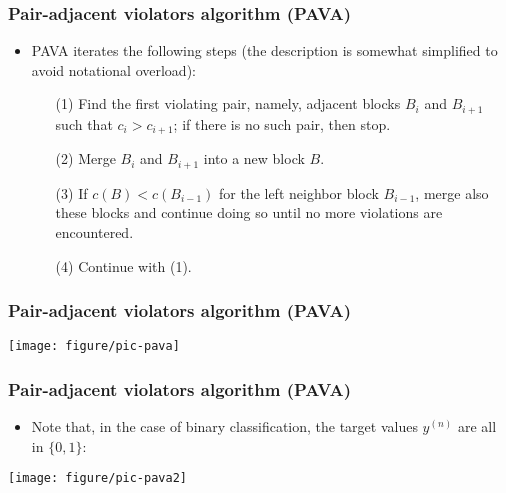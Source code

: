 \documentclass[11pt,compress,t,notes=noshow, xcolor=table]{beamer}
\begin{document}
\begin{frame}[t]
	\frametitle{Pair-adjacent violators algorithm (PAVA)}
	
	\begin{itemize}
		\item PAVA iterates the following steps (the description is somewhat simplified to avoid notational overload):
		
		\medskip
		
		\begin{itemize}
			\item[(1)] Find the first violating pair, namely, adjacent blocks $B_i$ and $B_{i+1}$ such that $c_i > c_{i+1}$; if there is no such pair, then stop.
			\item[(2)] Merge $B_i$ and $B_{i+1}$ into a new block $B$.
			\item[(3)] If $c(B) < c(B_{i-1})$ for the left neighbor block $B_{i-1}$, merge also these blocks and continue doing so until no more violations are encountered.
			\item[(4)] Continue with (1).
		\end{itemize}
	\end{itemize}
\end{frame}



\begin{frame}[t]
	\frametitle{Pair-adjacent violators algorithm (PAVA)}
	
	\medskip 
	
	\begin{center}
		\texttt{[image: figure/pic-pava]}
		
	\end{center}
\end{frame}

\begin{frame}[t]
	\frametitle{Pair-adjacent violators algorithm (PAVA)}
	
	\begin{itemize}
		\item Note that, in the case of binary classification, the target values $y^{(n)}$ are all in $\{ 0, 1 \}$:
	\end{itemize}
	
	\medskip 
	
	\begin{center}
		\texttt{[image: figure/pic-pava2]}
		
	\end{center}
\end{frame}
\end{document}
